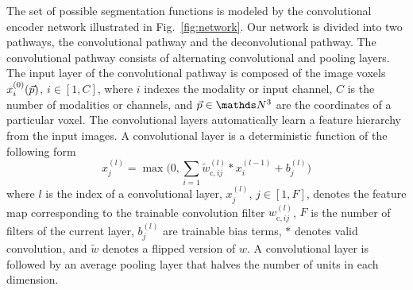 The set of possible segmentation functions is modeled by the convolutional
encoder network illustrated in Fig.~\ref{fig:network}. Our network is divided into
two pathways, the convolutional pathway and the deconvolutional pathway.
The convolutional pathway consists of alternating convolutional and pooling
layers. The input layer of the convolutional pathway is composed of the image
voxels $x^{(0)}_i(\vec{p})$, $i \in [1, C]$, where $i$ indexes the
modality or input channel, $C$ is the number of modalities or channels, and
$\vect{p} \in \N^3$ are the coordinates of a particular voxel. The convolutional
layers automatically learn a feature hierarchy from the input images. A
convolutional layer is a deterministic function of the following form
\begin{equation}
x^{(l)}_j = \max \Bigg(0, \sum_{i=1}\tilde{w}^{(l)}_{\text{c},ij}*x^{(l-1)}_i +
b^{(l)}_j\Bigg)
\end{equation}
where $l$ is the index of a convolutional layer, $x^{(l)}_j$, $j \in [1,F]$,
denotes the feature map corresponding to the trainable convolution filter
$w^{(l)}_{\text{c},ij}$, $F$ is the number of filters of the current layer,
$b^{(l)}_j$ are trainable bias terms, $*$ denotes valid convolution, and
$\tilde{w}$ denotes a flipped version of $w$. A convolutional layer is followed
by an average pooling layer that halves the number of units in each dimension.

